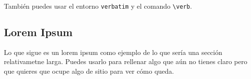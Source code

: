 También puedes usar el entorno \texttt{verbatim} y el comando \verb|\verb|.

\subsection{Lorem Ipsum}
Lo que sigue es un lorem ipsum como ejemplo de lo que sería una
sección relativametne larga. Puedes usarlo para rellenar algo que aún
no tienes claro pero que quieres que ocupe algo de sitio para ver cómo
queda.

\lipsum
